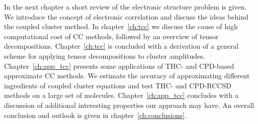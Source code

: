 In the next chapter a short review of the 
electronic structure problem is given. We introduce the concept of electronic 
correlation and discuss the ideas behind the coupled cluster method. In 
chapter~\ref{ch:tcc} we discuss the cause of high computational cost of CC 
methods, followed by an overview of tensor decompositions. 
Chapter~\ref{ch:tcc} is concluded with a derivation of a general scheme for 
applying tensor decompositions to cluster amplitudes. Chapter~\ref{ch:app_tcc} 
presents some applications of THC- and CPD-based approximate CC methods.  We 
estimate the accuracy of approximating different ingredients of coupled cluster 
equations and test THC- and CPD-RCCSD methods on a large set of 
molecules. Chapter~\ref{ch:app_tcc} concludes with a discussion of
additional interesting properties our approach may have. An overall conclusion 
and outlook is given in chapter~\ref{ch:conclusions}.

